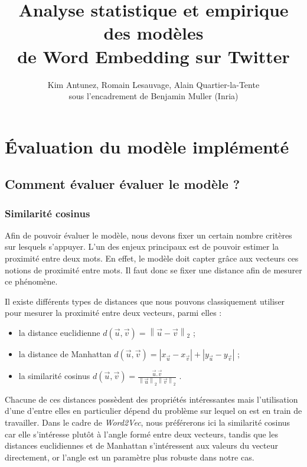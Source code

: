 \documentclass[11pt,french,french]{article}
\title{Analyse statistique et empirique des modèles\\
de Word Embedding sur Twitter}
\author{Kim Antunez, Romain Lesauvage, Alain Quartier-la-Tente\\
sous l'encadrement de Benjamin Muller (Inria)}
\date{}
\begin{document}
\maketitle


\section{Évaluation du modèle
implémenté}\label{uxe9valuation-du-moduxe8le-impluxe9mentuxe9}

\subsection{Comment évaluer évaluer le modèle
?}\label{comment-uxe9valuer-uxe9valuer-le-moduxe8le}

\subsubsection{Similarité cosinus}\label{similarituxe9-cosinus}

Afin de pouvoir évaluer le modèle, nous devons fixer un certain nombre
critères sur lesquels s'appuyer. L'un des enjeux principaux est de
pouvoir estimer la proximité entre deux mots. En effet, le modèle doit
capter grâce aux vecteurs ces notions de proximité entre mots. Il faut
donc se fixer une distance afin de mesurer ce phénomène.

Il existe différents types de distances que nous pouvons classiquement
utiliser pour mesurer la proximité entre deux vecteurs, parmi elles :

\begin{itemize}
\item la distance euclidienne $ d(\vec{u},\vec{v}) = \left\| \vec{u} - \vec{v}  \right\|_2$ ;
\item la distance de Manhattan $ d(\vec{u},\vec{v}) = |x_{\vec{u}} - x_{\vec{v}} | + |y_{\vec{u}} - y_{\vec{v}} |$ ;
\item la similarité cosinus $ d(\vec{u}, \vec{v}) = \frac{\vec{u}.\vec{v}}{\left\| \vec{u} \right\|_2  \left\| \vec{v} \right\|_2 }$ .
\end{itemize}

Chacune de ces distances possèdent des propriétés intéressantes mais
l'utilisation d'une d'entre elles en particulier dépend du problème sur
lequel on est en train de travailler. Dans le cadre de \emph{Word2Vec},
nous préférerons ici la similarité cosinus car elle s'intéresse plutôt à
l'angle formé entre deux vecteurs, tandis que les distances euclidiennes
et de Manhattan s'intéressent aux valeurs du vecteur directement, or
l'angle est un paramètre plus robuste dans notre cas.
\end{document}
